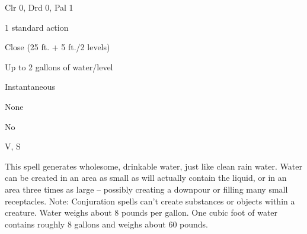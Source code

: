 
\begin{description*}
\item[Level:] Clr 0, Drd 0, Pal 1
\item[Casting Time:] 1 standard action
\item[Range:] Close (25 ft. + 5 ft./2 levels)
\item[Effect:] Up to 2 gallons of water/level
\item[Duration:] Instantaneous
\item[Saving Throw:] None
\item[Spell Resistance:] No
\item[Components:] V, S
\end{description*}

This spell generates wholesome, drinkable water, just like clean rain water. Water
can be created in an area as small as will actually contain the liquid, or in an
area three times as large -- possibly creating a downpour or filling many small
receptacles.
Note: Conjuration spells can't create substances or objects within a creature.
Water weighs about 8 pounds per gallon. One cubic foot of water contains roughly
8 gallons and weighs about 60 pounds.